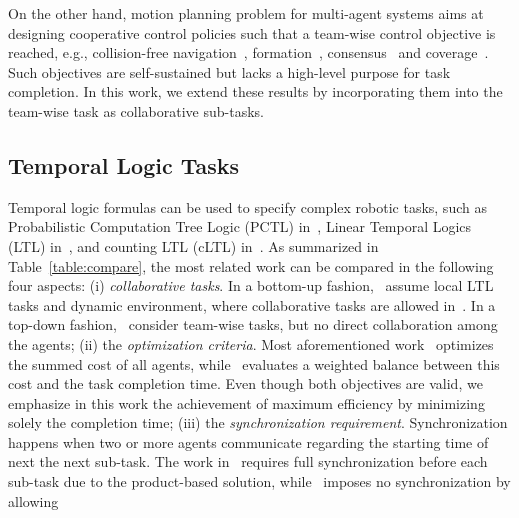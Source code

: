 On the other hand,
motion planning problem for multi-agent systems aims at designing cooperative control policies such that a team-wise control objective is reached,
e.g., collision-free navigation~\cite{lavalle2006planning}, formation~\cite{chen2005formation},
consensus~\cite{li2009consensus} and coverage~\cite{mesbahi2010graph}.
Such objectives are self-sustained but lacks a high-level purpose for task completion.
In this work, we extend these results by incorporating them into the team-wise task as collaborative sub-tasks.


\subsection{Temporal Logic Tasks}\label{subsec:multi-ltl}

Temporal logic formulas can be used to specify complex robotic tasks,
such as Probabilistic Computation Tree Logic (PCTL) in~\cite{lahijanian2011temporal},
Linear Temporal Logics (LTL) in~\cite{kantaros2020stylus, schillinger2018simultaneous,
 guo2015multi, chen2011formal},
and counting LTL (cLTL) in~\cite{sahin2019multirobot}.
As summarized in Table~\ref{table:compare},
the most related work can be compared in the following four aspects:
(i) \emph{collaborative tasks}.
In a bottom-up fashion,~\cite{guo2015multi, tumova2016multi, guo2016task} assume local LTL tasks and dynamic environment,
where collaborative tasks are allowed in~\cite{guo2016task}.
In a top-down fashion,~\cite{kantaros2020stylus, schillinger2018simultaneous, luo2021temporal, sahin2019multirobot, jones2019scratchs} consider team-wise tasks,
but no direct collaboration among the agents;
(ii) the \emph{optimization criteria}.
Most aforementioned work~\cite{kantaros2020stylus, guo2016task, luo2021temporal, sahin2019multirobot, jones2019scratchs} optimizes
the summed cost of all agents,
while~\cite{schillinger2018simultaneous} evaluates a weighted balance between this cost and
the task completion time. 
Even though both objectives are valid,
we emphasize in this work the achievement of maximum efficiency by minimizing solely the completion time;
(iii) the \emph{synchronization requirement}.
Synchronization happens when two or more agents communicate regarding the starting time of next the next sub-task.
The work in~\cite{kantaros2020stylus, luo2021abstraction, sahin2019multirobot} requires
full synchronization before each sub-task due to the product-based solution,
while~\cite{schillinger2018simultaneous} imposes no synchronization by allowing
